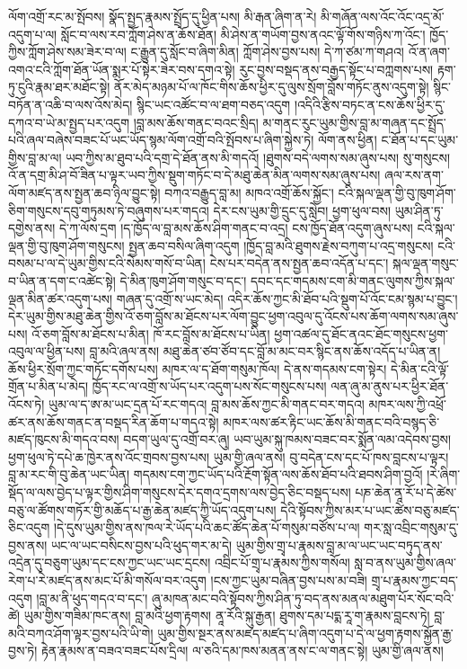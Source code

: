 \documentclass{article}
\begin{document}
ལོག་འགྲོ་རང་མ་སྤོབས། སྣོད་སྤྱད་རྣམས་སྤྲོད་དུ་ཕྱིན་པས། མི་རྒན་ཞིག་ན་རེ། མི་གཞོན་ལས་འོང་འོང་འདྲ་མོ་འདུག་པ་ལ། སློང་བ་ལས་རབ་ཀློག་ཤེས་ན་ཆོས་ཐོན། མི་ཤེས་ན་གཡོག་བྱས་ནའང་ལྟོ་གོས་གཉིས་ཀ་འོང་། ཁྱོད་ཀྱིས་ཀློག་ཤེས་སམ་ཟེར་བ་ལ། ང་རྒྱུན་དུ་སློང་བ་ཞིག་མིན། ཀློག་ཤེས་བྱས་པས། དེ་ཀ་ཙམ་ཀ་གཤའ། འོ་ན་ཞག་འགའ་ངའི་ཀློག་ཐོན་ཡོན་སྨར་པོ་སྟེར་ཟེར་བས་དགའ་སྟེ། རུང་བྱས་བསྡད་ནས་བརྒྱད་སྟོང་པ་བཀླགས་པས། རྟག་ཏུ་ངུའི་རྣམ་ཐར་མཐོང་སྟེ། ནོར་མེད་མཉམ་པོ་ལ་ཁོང་གིས་ཆོས་ཕྱིར་དུ་ལུས་སྲོག་བློས་གཏོང་ནུས་འདུག་སྟེ། སྙིང་བཏོན་ན་འཆི་བ་ལས་འོས་མེད། སྙིང་ཡང་འཚོང་བ་ལ་ཐག་བཅད་འདུག །འདིའི་རྩིས་བཏང་ན་ངས་ཆོས་ཕྱིར་དུ་དཀའ་བ་ཡེ་མ་སྤྱད་པར་འདུག །བླ་མས་ཆོས་གནང་བའང་སྲིད། མ་གནང་རུང་ཡུམ་གྱིས་བླ་མ་གཞན་དང་སྤྲོད་པའི་ཞལ་བཞེས་བཟང་པོ་ཡང་ཡོད་སྙམ་ལོག་འགྲོ་བའི་སྤོབས་པ་ཞིག་སྐྱེས་ཏེ། ལོག་ནས་ཕྱིན། ང་ཐོན་པ་དང་ཡུམ་གྱིས་བླ་མ་ལ། ཡབ་ཀྱིས་མ་ཐུབ་པའི་དགྲ་དེ་ཐོན་ནས་མི་གདའོ། །ཐུགས་བདེ་ལགས་སམ་ཞུས་པས། སུ་གསུངས། འོ་ན་དགྲ་མི་ཤ་བོ་ཟིན་པ་ལྟར་ཡབ་ཀྱིས་སྡུག་གཏོང་བ་དེ་མཐུ་ཆེན་མིན་ལགས་སམ་ཞུས་པས། ཞལ་རས་ནག་ལོག་མཛད་ནས་སྤྱན་ཆབ་ཉིལ་བྱུང་སྟེ། བཀའ་བརྒྱུད་བླ་མ། མཁའ་འགྲོ་ཆོས་སྐྱོང་། ངའི་སྐལ་ལྡན་གྱི་བུ་ཁུག་ཤོག་ཅིག་གསུངས་དབུ་གཏུམས་ཏེ་བཞུགས་པར་གདའ། དེར་ངས་ཡུམ་གྱི་དྲུང་དུ་སླེབ། ཕྱག་ཕུལ་བས། ཡུམ་ཤིན་ཏུ་དགྱེས་ནས། དེ་ཀ་ལོས་དྲག །ད་ཁྱོད་ལ་བླ་མས་ཆོས་ཤིག་གནང་བ་འདྲ། ངས་ཁྱོད་ཐོན་འདུག་ཞུས་པས། ངའི་སྐལ་ལྡན་གྱི་བུ་ཁུག་ཤོག་གསུངས། སྤྱན་ཆབ་བསིལ་ཞིག་འདུག །ཁྱོད་བླ་མའི་ཐུགས་རྗེས་བཀུག་པ་འདྲ་གསུངས། ངའི་བསམ་པ་ལ་དེ་ཡུམ་གྱིས་ངའི་སེམས་གསོ་བ་ཡིན། ངེས་པར་བདེན་ནས་སྤྱན་ཆབ་འདོན་པ་དང་། སྐལ་ལྡན་གསུང་བ་ཡིན་ན་དག་ང་འཚེང་སྟེ། དེ་མིན་ཁུག་ཤོག་གསུང་བ་དང་། དབང་དང་གདམས་ངག་མི་གནང་ལུགས་ཀྱིས་སྐལ་ལྡན་མིན་ཚར་འདུག་པས། གཞན་དུ་འགྲོ་ས་ཡང་མེད། འདིར་ཆོས་ཀྱང་མི་ཐོབ་པའི་སྡུག་པོ་འོང་ངམ་སྙམ་པ་བྱུང་། དེར་ཡུམ་གྱིས་མཐུ་ཆེན་གྱིས་འོ་ཅག་བློས་མ་ཐོངས་པར་ལོག་བྱུང་ཕྱག་འབུལ་དུ་འོངས་པས་ཆོག་ལགས་སམ་ཞུས་པས། འོ་ཅག་བློས་མ་ཐོངས་པ་མིན། ཁོ་རང་བློས་མ་ཐོངས་པ་ཡིན། ཕྱག་འཚལ་དུ་ཐོང་ནའང་ཐོང་གསུངས་ཕྱག་འབུལ་ལ་ཕྱིན་པས། བླ་མའི་ཞལ་ནས། མཐུ་ཆེན་ཙབ་ཙོབ་དང་བློ་མ་མང་བར་སྙིང་ནས་ཆོས་འདོད་པ་ཡིན་ན། ཆོས་ཕྱིར་སྲོག་ཀྱང་གཏོང་དགོས་པས། མཁར་ལ་ད་ཐོག་གསུམ་ཁོལ། དེ་ནས་གདམས་ངག་སྟེར། དེ་མིན་ངའི་ལྟོ་གྲོན་པ་མིན་པ་མེད། ཁྱོད་རང་ལ་འགྲོ་ས་ཡོད་པར་འདུག་པས་སོང་གསུངས་པས། ལན་ཞུ་མ་ནུས་པར་ཕྱིར་ཐོན་འོངས་ཏེ། ཡུམ་ལ་ད་ཨ་མ་ཡང་དྲན་པོ་རང་གདའ། བླ་མས་ཆོས་ཀྱང་མི་གནང་བར་གདའ། མཁར་ལས་ཀྱི་འཕྲོ་ཚར་ནས་ཆོས་གནང་ན་བསྡད་རིན་ཆོག་པ་གདའ་སྟེ། མཁར་ལས་ཚར་རྟིང་ཡང་ཆོས་མི་གནང་བའི་བསྙད་ཅི་མཛད་ཁུངས་མི་གདའ་བས། བདག་ཡུལ་དུ་འགྲོ་བར་ཞུ། ཡབ་ཡུམ་སྐུ་ཁམས་བཟང་བར་སྨོན་ལམ་འདེབས་བྱས། ཕྱག་ཕུལ་ཏེ་དཔེ་ཆ་ཁྱེར་ནས་འོང་གྲབས་བྱས་པས། ཡུམ་གྱི་ཞལ་ནས། བུ་བདེན་ངས་དང་པོ་ཁས་བླངས་པ་ལྟར། བླ་མ་རང་གི་བུ་ཆེན་ཡང་ཡིན། གདམས་ངག་ཀྱང་ཡོད་པའི་རྔོག་སྟོན་ལས་ཆོས་ཐོབ་པའི་ཐབས་ཤིག་བྱའོ། །རེ་ཞིག་སྡོད་ལ་ལས་བྱེད་པ་ལྟར་གྱིས་ཤིག་གསུངས་དེར་དགའ་དྲགས་ལས་བྱེད་ཅིང་བསྡད་པས། པཎ་ཆེན་ནཱ་རོ་པ་དེ་ཚེས་བཅུ་ལ་ཚོགས་གཏོར་གྱི་མཆོད་པ་རྒྱ་ཆེན་མཛད་ཀྱི་ཡོད་འདུག་པས། དེའི་སྟོབས་ཀྱིས་མར་པ་ཡང་ཚེས་བཅུ་མཛད་ཅིང་འདུག །དེ་དུས་ཡུམ་གྱིས་ནས་ཁལ་རེ་ཡོད་པའི་ཆང་ཚོད་ཆེན་པོ་གསུམ་བཙོས་པ་ལ། གར་སླ་འབྲིང་གསུམ་དུ་བྱས་ནས། ཡང་ལ་ཡང་བསིངས་བྱས་པའི་ཕུད་གར་མ་དེ། ཡུམ་གྱིས་གྲྭ་པ་རྣམས་བླ་མ་ལ་ཡང་ཡང་བཏུད་ནས་འདྲེན་དུ་བཅུག་ཡུམ་དང་ངས་ཀྱང་ཡང་ཡང་དྲངས། འབྲིང་པོ་གྲྭ་པ་རྣམས་ཀྱིས་གསོལ། སླ་བ་ནས་ཡུམ་གྱིས་ཞལ་རེག་པ་རེ་མཛད་ནས་མང་པོ་མི་གསོལ་བར་འདུག །ངས་ཀྱང་ཡུམ་བཞིན་བྱས་པས་མ་བཟི། གྲྭ་པ་རྣམས་ཀྱང་བད་འདུག །བླ་མ་ནི་ཕུད་གདའ་བ་དང་། ཞུ་མཁན་མང་བའི་སྟོབས་ཀྱིས་ཤིན་ཏུ་བད་ནས་མནལ་མཐུག་པོར་སོང་བའི་ཚེ། ཡུམ་གྱིས་གཟིམ་ཁང་ནས། བླ་མའི་ཕྱག་རྟགས། ནཱ་རོའི་སྐུ་རྒྱན། ཐུགས་དམ་པདྨ་རཱ་ག་རྣམས་བླངས་ཏེ། བླ་མའི་བཀའ་ཤོག་ལྟར་བྱས་པའི་ཡི་གེ། ཡུམ་གྱིས་སྔར་ནས་མཛད་མཛད་པ་ཞིག་འདུག་པ་དེ་ལ་ཕྱག་རྟགས་སྐྱོན་རྒྱ་བྱས་ཏེ། རྟེན་རྣམས་ན་བཟའ་བཟང་པོས་དྲིལ། ལ་ཅའི་དམ་ཁས་མནན་ནས་ང་ལ་གནང་སྟེ། ཡུམ་གྱི་ཞལ་ནས། 
\end{document}
